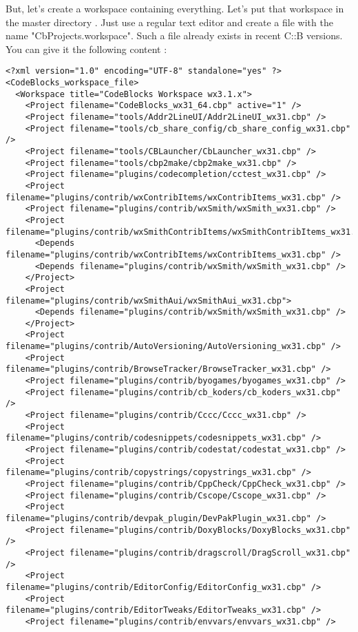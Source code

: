 But, let's create a workspace containing everything. Let's put that workspace in the master directory . Just use a regular text editor and create a file with the name "CbProjects.workspace". Such a file already exists in recent C::B versions. You can give it the following content : 

\begin{verbatim}
<?xml version="1.0" encoding="UTF-8" standalone="yes" ?>
<CodeBlocks_workspace_file>
  <Workspace title="CodeBlocks Workspace wx3.1.x">
    <Project filename="CodeBlocks_wx31_64.cbp" active="1" />
    <Project filename="tools/Addr2LineUI/Addr2LineUI_wx31.cbp" />
    <Project filename="tools/cb_share_config/cb_share_config_wx31.cbp" />
    <Project filename="tools/CBLauncher/CbLauncher_wx31.cbp" />
    <Project filename="tools/cbp2make/cbp2make_wx31.cbp" />
    <Project filename="plugins/codecompletion/cctest_wx31.cbp" />
    <Project filename="plugins/contrib/wxContribItems/wxContribItems_wx31.cbp" />
    <Project filename="plugins/contrib/wxSmith/wxSmith_wx31.cbp" />
    <Project filename="plugins/contrib/wxSmithContribItems/wxSmithContribItems_wx31.cbp">
      <Depends filename="plugins/contrib/wxContribItems/wxContribItems_wx31.cbp" />
      <Depends filename="plugins/contrib/wxSmith/wxSmith_wx31.cbp" />
    </Project>
    <Project filename="plugins/contrib/wxSmithAui/wxSmithAui_wx31.cbp">
      <Depends filename="plugins/contrib/wxSmith/wxSmith_wx31.cbp" />
    </Project>
    <Project filename="plugins/contrib/AutoVersioning/AutoVersioning_wx31.cbp" />
    <Project filename="plugins/contrib/BrowseTracker/BrowseTracker_wx31.cbp" />
    <Project filename="plugins/contrib/byogames/byogames_wx31.cbp" />
    <Project filename="plugins/contrib/cb_koders/cb_koders_wx31.cbp" />
    <Project filename="plugins/contrib/Cccc/Cccc_wx31.cbp" />
    <Project filename="plugins/contrib/codesnippets/codesnippets_wx31.cbp" />
    <Project filename="plugins/contrib/codestat/codestat_wx31.cbp" />
    <Project filename="plugins/contrib/copystrings/copystrings_wx31.cbp" />
    <Project filename="plugins/contrib/CppCheck/CppCheck_wx31.cbp" />
    <Project filename="plugins/contrib/Cscope/Cscope_wx31.cbp" />
    <Project filename="plugins/contrib/devpak_plugin/DevPakPlugin_wx31.cbp" />
    <Project filename="plugins/contrib/DoxyBlocks/DoxyBlocks_wx31.cbp" />
    <Project filename="plugins/contrib/dragscroll/DragScroll_wx31.cbp" />
    <Project filename="plugins/contrib/EditorConfig/EditorConfig_wx31.cbp" />
    <Project filename="plugins/contrib/EditorTweaks/EditorTweaks_wx31.cbp" />
    <Project filename="plugins/contrib/envvars/envvars_wx31.cbp" />

\end{verbatim}
